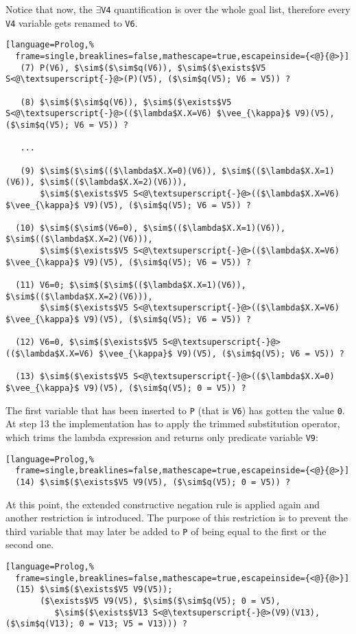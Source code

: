 \documentclass[inscr,ack,preface]{dithesis}
\theoremstyle{definition}
\begin{document}
Notice that now, the \texttt{$\exists$V4} quantification is over the whole goal list, therefore every \texttt{V4} variable gets renamed to \texttt{V6}.
\begin{lstlisting}[language=Prolog,%
  frame=single,breaklines=false,mathescape=true,escapeinside={<@}{@>}]
   (7) P(V6), $\sim$($\sim$q(V6)), $\sim$($\exists$V5 S<@\textsuperscript{-}@>(P)(V5), ($\sim$q(V5); V6 = V5)) ?

   (8) $\sim$($\sim$q(V6)), $\sim$($\exists$V5 S<@\textsuperscript{-}@>(($\lambda$X.X=V6) $\vee_{\kappa}$ V9)(V5), ($\sim$q(V5); V6 = V5)) ?

   ...

   (9) $\sim$($\sim$(($\lambda$X.X=0)(V6)), $\sim$(($\lambda$X.X=1)(V6)), $\sim$(($\lambda$X.X=2)(V6))),
       $\sim$($\exists$V5 S<@\textsuperscript{-}@>(($\lambda$X.X=V6) $\vee_{\kappa}$ V9)(V5), ($\sim$q(V5); V6 = V5)) ?

  (10) $\sim$($\sim$(V6=0), $\sim$(($\lambda$X.X=1)(V6)), $\sim$(($\lambda$X.X=2)(V6))),
       $\sim$($\exists$V5 S<@\textsuperscript{-}@>(($\lambda$X.X=V6) $\vee_{\kappa}$ V9)(V5), ($\sim$q(V5); V6 = V5)) ?

  (11) V6=0; $\sim$($\sim$(($\lambda$X.X=1)(V6)), $\sim$(($\lambda$X.X=2)(V6))),
       $\sim$($\exists$V5 S<@\textsuperscript{-}@>(($\lambda$X.X=V6) $\vee_{\kappa}$ V9)(V5), ($\sim$q(V5); V6 = V5)) ?

  (12) V6=0, $\sim$($\exists$V5 S<@\textsuperscript{-}@>(($\lambda$X.X=V6) $\vee_{\kappa}$ V9)(V5), ($\sim$q(V5); V6 = V5)) ?

  (13) $\sim$($\exists$V5 S<@\textsuperscript{-}@>(($\lambda$X.X=0) $\vee_{\kappa}$ V9)(V5), ($\sim$q(V5); 0 = V5)) ?
\end{lstlisting}

The first variable that has been inserted to \texttt{P} (that is \texttt{V6}) has gotten the value \texttt{0}. At step 13 the implementation has to apply the trimmed substitution operator, which trims the lambda expression and returns only predicate variable \texttt{V9}:
\begin{lstlisting}[language=Prolog,%
  frame=single,breaklines=false,mathescape=true,escapeinside={<@}{@>}]
  (14) $\sim$($\exists$V5 V9(V5), ($\sim$q(V5); 0 = V5)) ?
\end{lstlisting}

At this point, the extended constructive negation rule is applied again and another restriction is introduced. The purpose of this restriction is to prevent the third variable that may later be added to \texttt{P} of being equal to the first or the second one.
\begin{lstlisting}[language=Prolog,%
  frame=single,breaklines=false,mathescape=true,escapeinside={<@}{@>}]
  (15) $\sim$($\exists$V5 V9(V5));
       ($\exists$V5 V9(V5), $\sim$($\sim$q(V5); 0 = V5),
          $\sim$($\exists$V13 S<@\textsuperscript{-}@>(V9)(V13), ($\sim$q(V13); 0 = V13; V5 = V13))) ?
\end{lstlisting}
\end{document}
